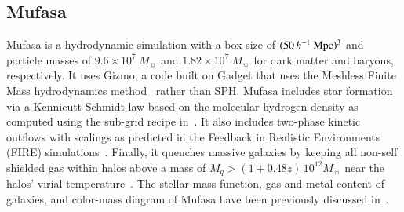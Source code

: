 \documentclass[tighten, preprint]{aastex62}
\begin{document}
\subsection{{\sc Mufasa}} \label{sec:mufasa}
{\sc Mufasa} is a hydrodynamic simulation with a box size of 
$(50\,h^{-1}\ {\rm Mpc})^3$ and particle masses of $9.6 \times 10^7\ M_{\sun}$ 
and $1.82 \times 10^7\ M_{\sun}$ for dark matter and baryons, respectively. 
It  uses {\sc Gizmo}, a code built on {\sc Gadget} that uses the Meshless 
Finite Mass hydrodynamics method~\citep{hopkins2015a} rather than SPH.  %
{\sc Mufasa} includes star formation via a Kennicutt-Schmidt law based on the  molecular hydrogen 
density as computed using the sub-grid recipe in~\cite{krumholz2011}. 
It also includes two-phase kinetic outflows with scalings as predicted 
in the Feedback in Realistic Environments (FIRE) simulations~\citep{muratov2015}.
Finally, it quenches massive galaxies by keeping all non-self shielded 
gas within halos above a mass of $M_q>(1+0.48 z)\,10^{12}M_\sun$ %
near the halos' virial temperature~\citep{gabor2015, mitra2015}. The stellar mass 
function, gas and metal content of galaxies, and color-mass 
diagram of {\sc Mufasa} have been previously discussed 
in~\citet{dave2016,dave2017,dave2017b}.
\end{document}
